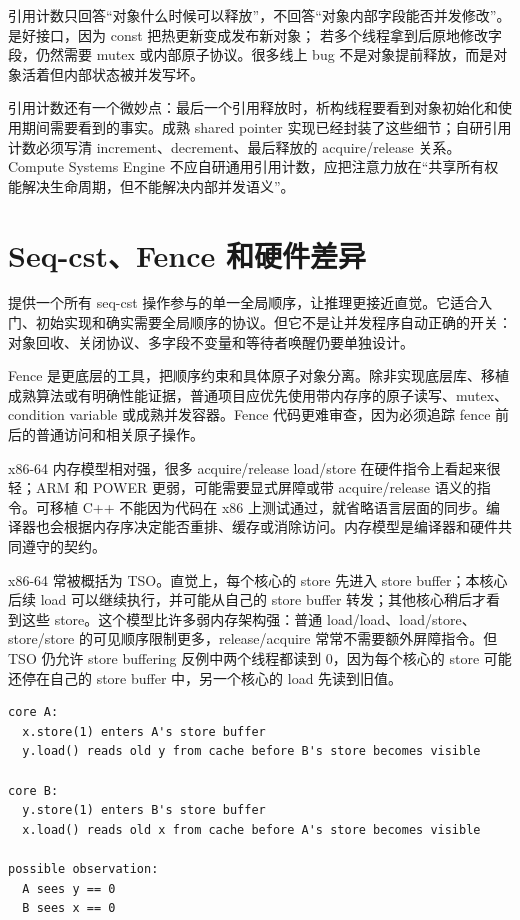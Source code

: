 引用计数只回答“对象什么时候可以释放”，不回答“对象内部字段能否并发修改”。 是好接口，因为 const 把热更新变成发布新对象； 若多个线程拿到后原地修改字段，仍然需要 mutex 或内部原子协议。很多线上 bug 不是对象提前释放，而是对象活着但内部状态被并发写坏。

引用计数还有一个微妙点：最后一个引用释放时，析构线程要看到对象初始化和使用期间需要看到的事实。成熟 shared pointer 实现已经封装了这些细节；自研引用计数必须写清 increment、decrement、最后释放的 acquire/release 关系。Compute Systems Engine 不应自研通用引用计数，应把注意力放在“共享所有权能解决生命周期，但不能解决内部并发语义”。

\section{Seq-cst、Fence 和硬件差异}

 提供一个所有 seq-cst 操作参与的单一全局顺序，让推理更接近直觉。它适合入门、初始实现和确实需要全局顺序的协议。但它不是让并发程序自动正确的开关：对象回收、关闭协议、多字段不变量和等待者唤醒仍要单独设计。

Fence 是更底层的工具，把顺序约束和具体原子对象分离。除非实现底层库、移植成熟算法或有明确性能证据，普通项目应优先使用带内存序的原子读写、mutex、condition variable 或成熟并发容器。Fence 代码更难审查，因为必须追踪 fence 前后的普通访问和相关原子操作。

x86-64 内存模型相对强，很多 acquire/release load/store 在硬件指令上看起来很轻；ARM 和 POWER 更弱，可能需要显式屏障或带 acquire/release 语义的指令。可移植 C++ 不能因为代码在 x86 上测试通过，就省略语言层面的同步。编译器也会根据内存序决定能否重排、缓存或消除访问。内存模型是编译器和硬件共同遵守的契约。

x86-64 常被概括为 TSO。直觉上，每个核心的 store 先进入 store buffer；本核心后续 load 可以继续执行，并可能从自己的 store buffer 转发；其他核心稍后才看到这些 store。这个模型比许多弱内存架构强：普通 load/load、load/store、store/store 的可见顺序限制更多，release/acquire 常常不需要额外屏障指令。但 TSO 仍允许 store buffering 反例中两个线程都读到 0，因为每个核心的 store 可能还停在自己的 store buffer 中，另一个核心的 load 先读到旧值。

\begin{lstlisting}[numbers=none,caption={TSO 直觉下的 store buffering 账本}]
core A:
  x.store(1) enters A's store buffer
  y.load() reads old y from cache before B's store becomes visible

core B:
  y.store(1) enters B's store buffer
  x.load() reads old x from cache before A's store becomes visible

possible observation:
  A sees y == 0
  B sees x == 0
\end{lstlisting}

